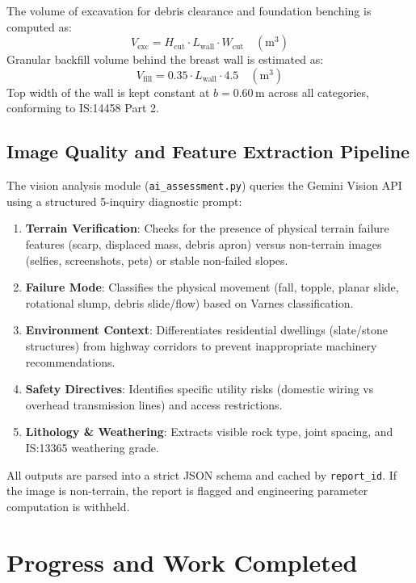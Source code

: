 \documentclass[12pt,a4paper]{report}
\begin{document}
The volume of excavation for debris clearance and foundation benching is computed as:
\begin{equation}
    V_{\text{exc}} = H_{\text{cut}} \cdot L_{\text{wall}} \cdot W_{\text{cut}} \quad (\text{m}^3)
\end{equation}
Granular backfill volume behind the breast wall is estimated as:
\begin{equation}
    V_{\text{fill}} = 0.35 \cdot L_{\text{wall}} \cdot 4.5 \quad (\text{m}^3)
\end{equation}
Top width of the wall is kept constant at $b = 0.60\,\text{m}$ across all categories, conforming to IS:14458 Part 2.

\section{Image Quality and Feature Extraction Pipeline}
The vision analysis module (\texttt{ai\_assessment.py}) queries the Gemini Vision API using a structured 5-inquiry diagnostic prompt:
\begin{enumerate}[noitemsep]
    \item \textbf{Terrain Verification}: Checks for the presence of physical terrain failure features (scarp, displaced mass, debris apron) versus non-terrain images (selfies, screenshots, pets) or stable non-failed slopes.
    \item \textbf{Failure Mode}: Classifies the physical movement (fall, topple, planar slide, rotational slump, debris slide/flow) based on Varnes classification.
    \item \textbf{Environment Context}: Differentiates residential dwellings (slate/stone structures) from highway corridors to prevent inappropriate machinery recommendations.
    \item \textbf{Safety Directives}: Identifies specific utility risks (domestic wiring vs overhead transmission lines) and access restrictions.
    \item \textbf{Lithology \& Weathering}: Extracts visible rock type, joint spacing, and IS:13365 weathering grade.
\end{enumerate}
All outputs are parsed into a strict JSON schema and cached by \texttt{report\_id}. If the image is non-terrain, the report is flagged and engineering parameter computation is withheld.

\newpage

\chapter{Progress and Work Completed}
\end{document}
